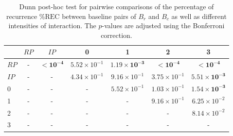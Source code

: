 \begin{table}
\centering
\caption{Dunn post-hoc test for pairwise comparisons of the percentage of recurrence $\%\text{REC}$ between baseline pairs of $B_r$ and $B_c$ as well as different intensities of interaction. The $p$-values are adjusted using the Bonferroni correction.}
\label{tab:dunn_rec}
\begin{tabular}{lcccccc}
\toprule
 & $RP$ & $IP$ & 0 & 1 & 2 & 3 \\
\midrule
$RP$ & - & $\mathbf{< 10^{-4}}$ & $5.52 \times 10^{-1}$ & $\mathbf{1.19 \times 10^{-3}}$ & $\mathbf{< 10^{-4}}$ & $\mathbf{< 10^{-4}}$ \\
$IP$ & - & - & $4.34 \times 10^{-1}$ & $9.16 \times 10^{-1}$ & $3.75 \times 10^{-1}$ & $\mathbf{5.51 \times 10^{-3}}$ \\
0 & - & - & - & $5.52 \times 10^{-1}$ & $1.03 \times 10^{-1}$ & $\mathbf{1.54 \times 10^{-3}}$ \\
1 & - & - & - & - & $9.16 \times 10^{-1}$ & $6.25 \times 10^{-2}$ \\
2 & - & - & - & - & - & $8.14 \times 10^{-2}$ \\
3 & - & - & - & - & - & - \\
\bottomrule
\end{tabular}
\end{table}
